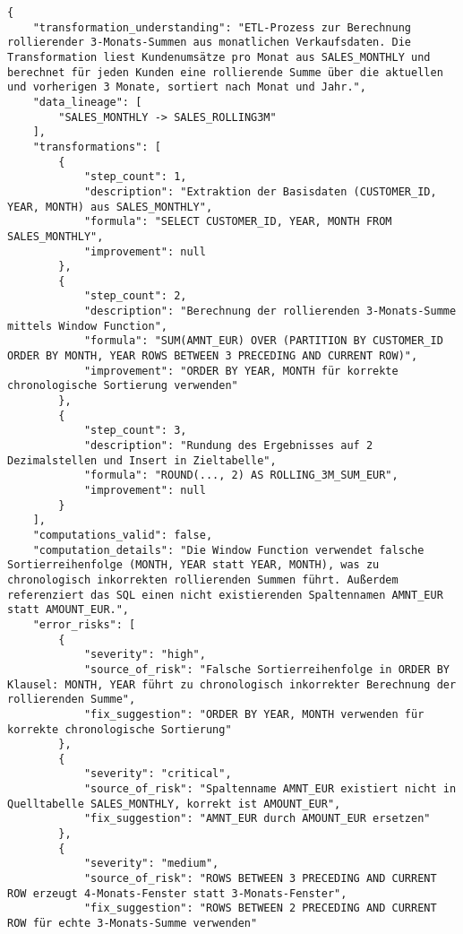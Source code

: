 \begin{lstlisting}[caption={Ausgabe: Claude Sonnet 4 Anwendungsfall 8 Konsistenzdurchlauf},label={claude_case8_prompt2}]
{
    "transformation_understanding": "ETL-Prozess zur Berechnung rollierender 3-Monats-Summen aus monatlichen Verkaufsdaten. Die Transformation liest Kundenumsätze pro Monat aus SALES_MONTHLY und berechnet für jeden Kunden eine rollierende Summe über die aktuellen und vorherigen 3 Monate, sortiert nach Monat und Jahr.",
    "data_lineage": [
        "SALES_MONTHLY -> SALES_ROLLING3M"
    ],
    "transformations": [
        {
            "step_count": 1,
            "description": "Extraktion der Basisdaten (CUSTOMER_ID, YEAR, MONTH) aus SALES_MONTHLY",
            "formula": "SELECT CUSTOMER_ID, YEAR, MONTH FROM SALES_MONTHLY",
            "improvement": null
        },
        {
            "step_count": 2,
            "description": "Berechnung der rollierenden 3-Monats-Summe mittels Window Function",
            "formula": "SUM(AMNT_EUR) OVER (PARTITION BY CUSTOMER_ID ORDER BY MONTH, YEAR ROWS BETWEEN 3 PRECEDING AND CURRENT ROW)",
            "improvement": "ORDER BY YEAR, MONTH für korrekte chronologische Sortierung verwenden"
        },
        {
            "step_count": 3,
            "description": "Rundung des Ergebnisses auf 2 Dezimalstellen und Insert in Zieltabelle",
            "formula": "ROUND(..., 2) AS ROLLING_3M_SUM_EUR",
            "improvement": null
        }
    ],
    "computations_valid": false,
    "computation_details": "Die Window Function verwendet falsche Sortierreihenfolge (MONTH, YEAR statt YEAR, MONTH), was zu chronologisch inkorrekten rollierenden Summen führt. Außerdem referenziert das SQL einen nicht existierenden Spaltennamen AMNT_EUR statt AMOUNT_EUR.",
    "error_risks": [
        {
            "severity": "high",
            "source_of_risk": "Falsche Sortierreihenfolge in ORDER BY Klausel: MONTH, YEAR führt zu chronologisch inkorrekter Berechnung der rollierenden Summe",
            "fix_suggestion": "ORDER BY YEAR, MONTH verwenden für korrekte chronologische Sortierung"
        },
        {
            "severity": "critical",
            "source_of_risk": "Spaltenname AMNT_EUR existiert nicht in Quelltabelle SALES_MONTHLY, korrekt ist AMOUNT_EUR",
            "fix_suggestion": "AMNT_EUR durch AMOUNT_EUR ersetzen"
        },
        {
            "severity": "medium",
            "source_of_risk": "ROWS BETWEEN 3 PRECEDING AND CURRENT ROW erzeugt 4-Monats-Fenster statt 3-Monats-Fenster",
            "fix_suggestion": "ROWS BETWEEN 2 PRECEDING AND CURRENT ROW für echte 3-Monats-Summe verwenden"

\end{lstlisting}
